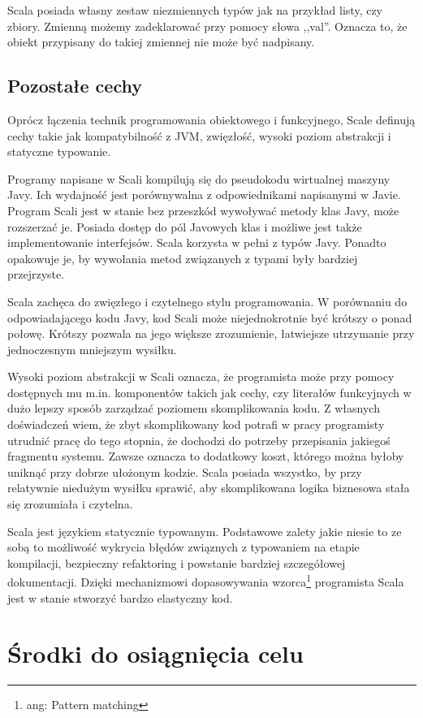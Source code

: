\documentclass[brudnopis]{xmgr}
\begin{document}
Scala posiada własny zestaw niezmiennych typów jak na przykład listy, czy zbiory. Zmienną możemy zadeklarować przy pomocy słowa ,,val''. Oznacza to, że obiekt przypisany do takiej zmiennej nie może być nadpisany.

\subsection{Pozostałe cechy}

Oprócz łączenia technik programowania obiektowego i funkcyjnego, Scale definują cechy takie jak kompatybilność z JVM, zwięzłość, wysoki poziom abstrakcji i statyczne typowanie. 

Programy napisane w Scali kompilują się do pseudokodu wirtualnej maszyny Javy. Ich wydajność jest porównywalna z odpowiednikami napisanymi w Javie. Program Scali jest w stanie bez przeszkód wywoływać metody klas Javy, może rozszerzać je. Posiada dostęp do pól Javowych klas i możliwe jest także implementowanie interfejsów. Scala korzysta w pełni z typów Javy. Ponadto opakowuje je, by wywołania metod związanych z typami były bardziej przejrzyste. 

Scala zachęca do zwięzłego i czytelnego stylu programowania. W porównaniu do odpowiadającego kodu Javy, kod Scali może niejednokrotnie być krótszy o ponad połowę. Krótszy pozwala na jego większe zrozumienie, łatwiejsze utrzymanie przy jednoczesnym mniejszym wysiłku.

Wysoki poziom abstrakcji w Scali oznacza, że programista może przy pomocy dostępnych mu m.in. komponentów takich jak cechy, czy literałów funkcyjnych w dużo lepszy sposób zarządzać poziomem skomplikowania kodu. Z własnych doświadczeń wiem, że zbyt skomplikowany kod potrafi w pracy programisty utrudnić pracę do tego stopnia, że dochodzi do potrzeby przepisania jakiegoś fragmentu systemu. Zawsze oznacza to dodatkowy koszt, którego można byłoby uniknąć przy dobrze ułożonym kodzie. Scala posiada wszystko, by przy relatywnie niedużym wysiłku sprawić, aby skomplikowana logika biznesowa stała się zrozumiała i czytelna.

Scala jest językiem statycznie typowanym. Podstawowe zalety jakie niesie to ze sobą to możliwość wykrycia błędów związnych z typowaniem na etapie kompilacji, bezpieczny refaktoring i powstanie bardziej szczegółowej dokumentacji. Dzięki mechanizmowi dopasowywania wzorca\footnote{ang: Pattern matching} programista Scala jest w stanie stworzyć bardzo elastyczny kod.

\section{Środki do osiągnięcia celu}
\end{document}
